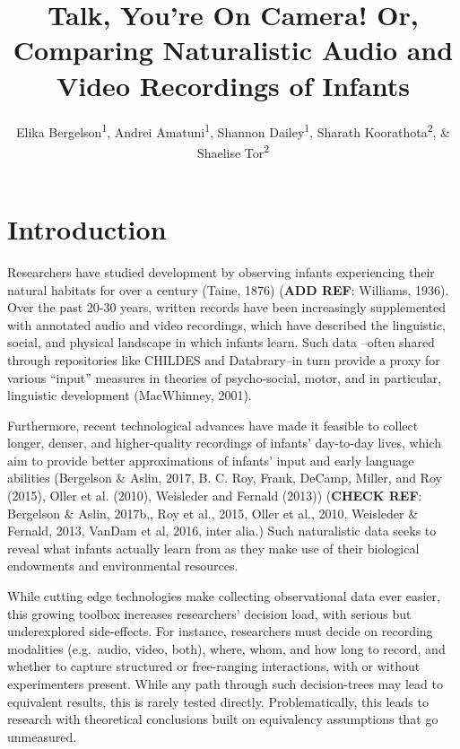 \documentclass[floatsintext,man]{apa6}
\title{Talk, You're On Camera! Or, Comparing Naturalistic Audio and Video
Recordings of Infants}
\author{Elika Bergelson\textsuperscript{1}, Andrei Amatuni\textsuperscript{1}, Shannon Dailey\textsuperscript{1}, Sharath Koorathota\textsuperscript{2}, \& Shaelise Tor\textsuperscript{2}}
\affiliation{
    \vspace{0.5cm}
          \textsuperscript{1} Duke University\\
          \textsuperscript{2} University of Rochester  }
\theoremstyle{definition}
\theoremstyle{definition}
\theoremstyle{definition}
\theoremstyle{remark}
\begin{document}
\maketitle

\setcounter{secnumdepth}{0}



\section{Introduction}\label{introduction}

Researchers have studied development by observing infants experiencing
their natural habitats for over a century (Taine, 1876) (\textbf{ADD
REF}: Williams, 1936). Over the past 20-30 years, written records have
been increasingly supplemented with annotated audio and video
recordings, which have described the linguistic, social, and physical
landscape in which infants learn. Such data --often shared through
repositories like CHILDES and Databrary--in turn provide a proxy for
various \enquote{input} measures in theories of psycho-social, motor,
and in particular, linguistic development (MacWhinney, 2001).

Furthermore, recent technological advances have made it feasible to
collect longer, denser, and higher-quality recordings of infants'
day-to-day lives, which aim to provide better approximations of infants'
input and early language abilities (Bergelson \& Aslin, 2017, B. C. Roy,
Frank, DeCamp, Miller, and Roy (2015), Oller et al. (2010), Weisleder
and Fernald (2013)) (\textbf{CHECK REF}: Bergelson \& Aslin, 2017b,, Roy
et al., 2015, Oller et al., 2010, Weisleder \& Fernald, 2013, VanDam et
al, 2016, inter alia.) Such naturalistic data seeks to reveal what
infants actually learn from as they make use of their biological
endowments and environmental resources.

While cutting edge technologies make collecting observational data ever
easier, this growing toolbox increases researchers' decision load, with
serious but underexplored side-effects. For instance, researchers must
decide on recording modalities (e.g.~audio, video, both), where, whom,
and how long to record, and whether to capture structured or
free-ranging interactions, with or without experimenters present. While
any path through such decision-trees may lead to equivalent results,
this is rarely tested directly. Problematically, this leads to research
with theoretical conclusions built on equivalency assumptions that go
unmeasured.
\end{document}
